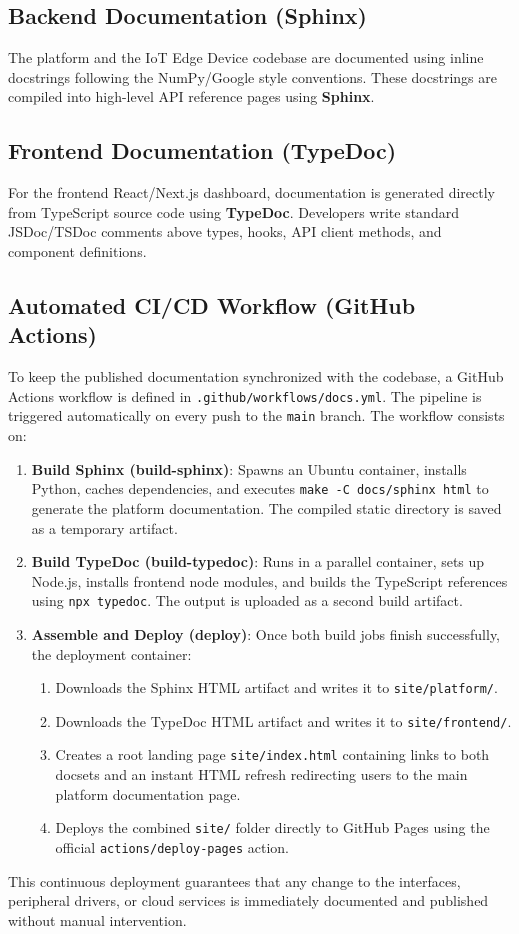 \subsection{Backend Documentation (Sphinx)}
The platform and the \gls{IoT} Edge Device codebase are documented using inline docstrings following the NumPy/Google style conventions. These docstrings are compiled into high-level \gls{API} reference pages using \textbf{Sphinx}.

\subsection{Frontend Documentation (TypeDoc)}
For the frontend React/Next.js dashboard, documentation is generated directly from TypeScript source code using \textbf{TypeDoc}. Developers write standard JSDoc/TSDoc comments above types, hooks, \gls{API} client methods, and component definitions.

\subsection{Automated \acrshort{CI/CD} Workflow (GitHub Actions)}
To keep the published documentation synchronized with the codebase, a GitHub Actions workflow is defined in \texttt{.github/workflows/docs.yml}. The pipeline is triggered automatically on every push to the \texttt{main} branch. The workflow consists on:

\begin{enumerate}
    \item \textbf{Build Sphinx (build-sphinx)}: Spawns an Ubuntu container, installs Python, caches dependencies, and executes \texttt{make -C docs/sphinx html} to generate the platform documentation. The compiled static directory is saved as a temporary artifact.
    \item \textbf{Build TypeDoc (build-typedoc)}: Runs in a parallel container, sets up Node.js, installs frontend node modules, and builds the TypeScript references using \texttt{npx typedoc}. The output is uploaded as a second build artifact.
    \item \textbf{Assemble and Deploy (deploy)}: Once both build jobs finish successfully, the deployment container:
    \begin{enumerate}
        \item Downloads the Sphinx HTML artifact and writes it to \texttt{site/platform/}.
        \item Downloads the TypeDoc HTML artifact and writes it to \texttt{site/frontend/}.
        \item Creates a root landing page \texttt{site/index.html} containing links to both docsets and an instant \gls{HTML} refresh redirecting users to the main platform documentation page.
        \item Deploys the combined \texttt{site/} folder directly to GitHub Pages using the official \texttt{actions/deploy-pages} action.
    \end{enumerate}
\end{enumerate}
This continuous deployment guarantees that any change to the interfaces, peripheral drivers, or cloud services is immediately documented and published without manual intervention.
